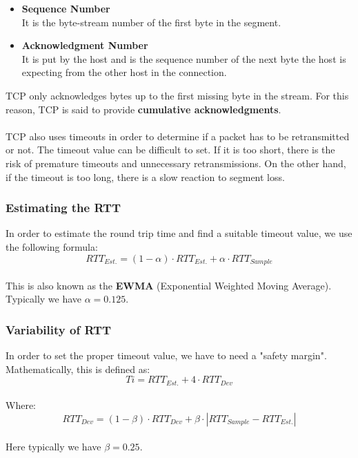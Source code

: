 \documentclass{article}
\begin{document}
\begin{itemize}
	\item \textbf{Sequence Number}
	\vspace{.2cm} \\
	It is the byte-stream number of the first byte in the segment.
	
	\item \textbf{Acknowledgment Number}
	\vspace{.2cm} \\
	It is put by the host and is the sequence number of the next byte the host is expecting from the other host in the connection.
\end{itemize}
TCP only acknowledges bytes up to the first missing byte in the stream. For this reason, TCP is said to provide \textbf{cumulative acknowledgments}. \\ \\
TCP also uses timeouts in order to determine if a packet has to be retransmitted or not. The timeout value can be difficult to set. If it is too short, there is the risk of premature timeouts and unnecessary retransmissions. On the other hand, if the timeout is too long, there is a slow reaction to segment loss.

\subsubsection{Estimating the RTT}
In order to estimate the round trip time and find a suitable timeout value, we use the following formula: \\

\[ RTT_{Est.} = (1 - \alpha) \cdot RTT_{Est.} + \alpha \cdot RTT_{Sample} \] \\
This is also known as the \textbf{EWMA} (Exponential Weighted Moving Average). Typically we have $\alpha = 0.125$.

\subsubsection{Variability of RTT}
In order to set the proper timeout value, we have to need a "safety margin". Mathematically, this is defined as: \\

\[ Ti = RTT_{Est.} + 4 \cdot RTT_{Dev} \] \\
Where: \\

\[ RTT_{Dev} = (1 - \beta) \cdot RTT_{Dev} + \beta \cdot | RTT_{Sample} - RTT_{Est.} | \] \\
Here typically we have $\beta = 0.25$.
\end{document}
